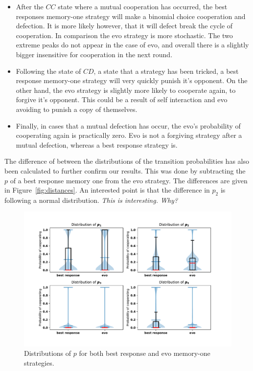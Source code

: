 \documentclass[10pt]{article}
\begin{document}
\begin{itemize}
    \item After the \(CC\) state where a mutual cooperation has occurred, the best
    responses memory-one strategy will make a binomial choice cooperation and defection.
    It is more likely however, that it will defect
    break the cycle of cooperation. In comparison the evo strategy is more stochastic. The
    two extreme peaks do not appear in the case of evo, and overall there is a
    slightly bigger insensitive for cooperation in the next round.
    \item Following the state of \(CD\), a state that a strategy has been tricked, a best
    response memory-one strategy will very quickly punish it's opponent.
    On the other hand, the evo strategy is slightly more likely
    to cooperate again, to forgive it's opponent. This could be a result of
    self interaction and evo avoiding to punish a copy of themselves.
    \item Finally, in cases that a mutual defection has occur, the evo's probability
    of cooperating again is practically zero. Evo is not a forgiving strategy after a mutual
    defection, whereas a best response strategy is.
\end{itemize}

The difference of between the distributions of the transition probabilities has
also been calculated to further confirm our results. This was done by
subtracting the \(p\) of a best response memory one from the evo strategy. The
differences are given in Figure~\ref{fig:distances}. An interested point is that
the difference in \(p_2\) is following a normal distribution. \textit{This is
interesting. Why?}

\begin{figure}[!htbp]
    \centering
    \includegraphics[width=.8\textwidth]{img/behaviour_violin_plots.pdf}
    \caption{Distributions of \(p\) for both best response and evo memory-one
    strategies.}
    \label{fig:behaviour_violin_plots}
\end{figure}
\end{document}
